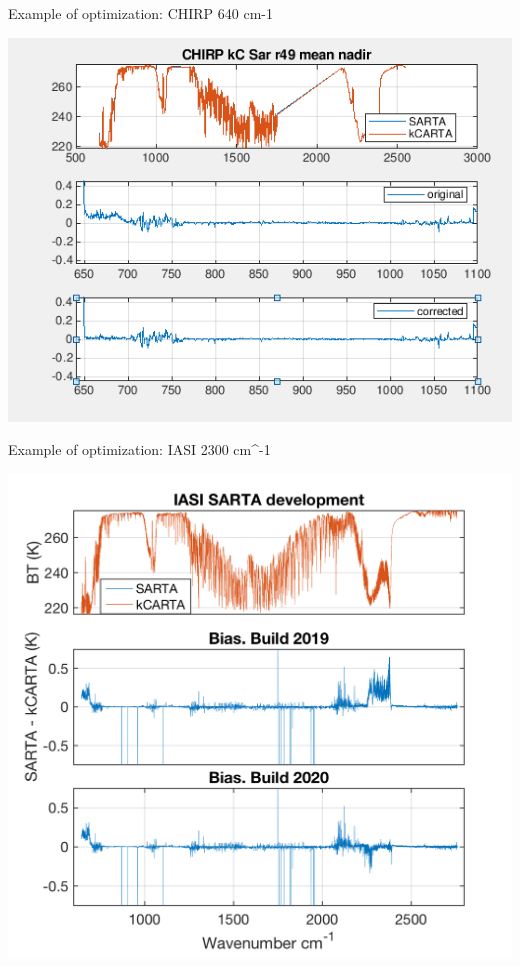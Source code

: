 \documentclass[10pt,t]{beamer}
\begin{document}
\begin{frame}{Example of optimization: CHIRP 640 cm-1}

  \begin{center}
    \includegraphics[width=0.6\linewidth]{./Figs/chirp_optimize1.png}
  \end{center}


\end{frame}
\begin{frame}[shrink=5]{Example of optimization: IASI 2300 cm^{-1}}

\vspace{-0.5cm}
  \begin{center}
    \includegraphics[width=0.6\linewidth]{./Figs/iasi_sarta_kcarta_mean_bias_4p3um_fx.png}
  \end{center}

\end{frame}
\end{document}
